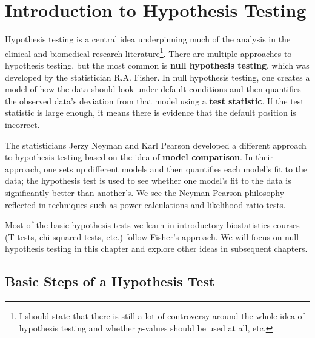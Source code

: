 \chapter{Introduction to Hypothesis Testing \label{chapter:hypothesistesting}}

Hypothesis testing is a central idea underpinning much of the analysis in the clinical and biomedical research literature\footnote{I should state that there is still a lot of controversy around the whole idea of hypothesis testing and whether $p$-values should be used at all, etc.}. There are multiple approaches to hypothesis testing, but the most common is \textbf{null hypothesis testing}, which was developed by the statistician R.A. Fisher. In null hypothesis testing, one creates a model of how the data should look under default conditions and then quantifies the observed data's deviation from that model using a \textbf{test statistic}. If the test statistic is large enough, it means there is evidence that the default position is incorrect. 

The statisticians Jerzy Neyman and Karl Pearson developed a different approach to hypothesis testing based on the idea of \textbf{model comparison}. In their approach, one sets up different models and then quantifies each model's fit to the data; the hypothesis test is used to see whether one model's fit to the data is significantly better than another's. We see the Neyman-Pearson philosophy reflected in techniques such as power calculations and likelihood ratio tests. 

Most of the basic hypothesis tests we learn in introductory biostatistics courses (T-tests, chi-squared tests, etc.) follow Fisher's approach. We will focus on null hypothesis testing in this chapter and explore other ideas in subsequent chapters. 


\section{Basic Steps of a Hypothesis Test}

